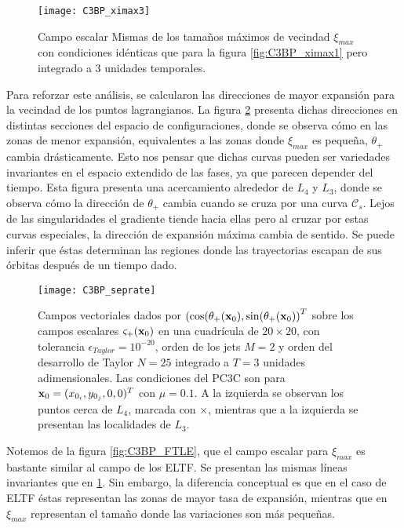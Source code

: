 \begin{figure}
 \centering
 \texttt{[image: C3BP\_ximax3]}
 \caption{Campo escalar Mismas de los tamaños máximos de vecindad $\xi_{max}$ con condiciones idénticas que para la figura \ref{fig:C3BP_ximax1} pero integrado a $3$ unidades temporales.}
 \label{fig:C3BP_ximax3}
\end{figure}

Para reforzar este análisis, se calcularon las direcciones de mayor expansión para la vecindad de los puntos lagrangianos. La figura \ref{fig:C3BP_seprate3} presenta dichas direcciones en distintas secciones del espacio de configuraciones, donde se observa cómo en las zonas de menor expansión, equivalentes a las zonas donde $\xi_{max}$ es pequeña,  $\theta_{+}$ cambia drásticamente. Esto nos pensar que dichas curvas pueden ser variedades invariantes en el espacio extendido de las fases, ya que parecen depender del tiempo. Esta figura presenta una acercamiento alrededor de $L_4$ y $L_3$, donde se observa cómo la dirección de  $\theta_{+}$ cambia cuando se cruza por una curva $\mathcal{C}_s$. Lejos de las singularidades el gradiente tiende hacia ellas pero al cruzar por estas curvas especiales, la dirección de expansión máxima cambia de sentido. Se puede inferir que éstas determinan las regiones donde las trayectorias escapan de sus órbitas después de un tiempo dado.


\begin{figure}
 \centering
 \texttt{[image: C3BP\_seprate]}
 \caption{Campos vectoriales dados por $\left( \cos(\theta_{+}(\mathbf{x}_0), \sin(\theta_{+}(\mathbf{x}_0) \right)^T$ sobre los campos escalares $\varsigma_{+}(\mathbf{x}_0)$ en una cuadrícula de $20 \times 20$, con tolerancia $\epsilon_{Taylor} = 10^{-20}$, orden de los jets $M=2$ y orden del desarrollo de Taylor $N = 25$ integrado a $T = 3$ unidades adimensionales. Las condiciones del PC3C son para $\mathbf{x}_0 = (x_{0_i}, y_{0_j}, 0, 0)^T$ con $\mu = 0.1$. A la izquierda se observan los puntos cerca de $L_4$, marcada con $\times$, mientras que a la izquierda se presentan las localidades de $L_3$.}
 \label{fig:C3BP_seprate3}
\end{figure}

Notemos de la figura \ref{fig:C3BP_FTLE}, que el campo escalar para $\xi_{max}$ es bastante similar al campo de los ELTF. Se presentan las mismas líneas invariantes que en \ref{fig:C3BP_ximax3}. Sin embargo, la diferencia conceptual es que en el caso de ELTF éstas representan las zonas de mayor tasa de expansión, mientras que en $\xi_{max}$ representan el tamaño donde las variaciones son más pequeñas.

